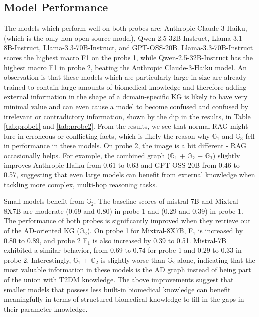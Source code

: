 \subsection{Model Performance}
The models which perform well on both probes are: Anthropic Claude-3-Haiku, (which is the only non-open source model), Qwen-2.5-32B-Instruct, Llama-3.1-8B-Instruct, Llama-3.3-70B-Instruct, and GPT-OSS-20B. Llama-3.3-70B-Instruct scores the highest macro F1 on the probe 1, while Qwen-2.5-32B-Instruct has the highest macro F1 in probe 2, beating the Anthropic Claude-3-Haiku model. An observation is that these models which are particularly large in size are already trained to contain large amounts of biomedical knowledge and therefore adding external information in the shape of a domain-specific KG is likely to have very minimal value and can even cause a model to become confused and confused by irrelevant or contradictory information, shown by the dip in the results, in Table \ref{tab:probe1} and \ref{tab:probe2}. From the results, we see that normal RAG might lure in erroneous or conflicting facts, which is likely the reason why $\mathbb{G}_1$ and $\mathbb{G}_3$ fell in performance in these models. On probe 2, the image is a bit different - RAG occasionally helps. For example, the combined graph ($\mathbb{G}_1$ + $\mathbb{G}_2$ + $\mathbb{G}_3$) slightly improves Anthropic Haiku from 0.61 to 0.63 and GPT-OSS-20B from 0.46 to 0.57, suggesting that even large models can benefit from external knowledge when tackling more complex, multi-hop reasoning tasks.

Small models benefit from $\mathbb{G}_2$. The baseline scores of mistral-7B and Mixtral-8X7B are moderate (0.69 and 0.80) in probe 1 and (0.29 and 0.39) in probe 1. The performance of both probes is significantly improved when they retrieve out of the AD-oriented KG ($\mathbb{G}_2$). On probe 1 for Mixtral-8X7B, F$_1$ is increased by 0.80 to 0.89, and probe 2 F$_1$ is also increased by 0.39 to 0.51. Mistral-7B exhibited a similar behavior, from 0.69 to 0.74 for probe 1 and 0.29 to 0.33 in probe 2. Interestingly, $\mathbb{G}_1$ + $\mathbb{G}_2$ is slightly worse than $\mathbb{G}_2$ alone, indicating that the most valuable information in these models is the AD graph instead of being part of the union with T2DM knowledge. The above improvements suggest that smaller models that possess less built-in biomedical knowledge can benefit meaningfully in terms of structured biomedical knowledge to fill in the gaps in their parameter knowledge. 

